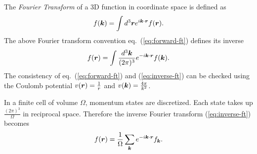 \begin{definition}
\label{sec:def-ft}
The \textit{Fourier Transform} of a 3D function in coordinate space is defined as
\begin{align}
f(\boldsymbol{k}) = \int d^3\boldsymbol{r} e^{i\boldsymbol{k}\cdot\boldsymbol{r}} f(\boldsymbol{r}). \label{eq:forward-ft}
\end{align}
The above Fourier transform convention eq.~(\ref{eq:forward-ft}) defines its inverse
\begin{align}
f(\boldsymbol{r}) = \int \frac{d^3\boldsymbol{k}}{(2\pi)^3} e^{-i\boldsymbol{k}\cdot\boldsymbol{r}} f(\boldsymbol{k}). \label{eq:inverse-ft}
\end{align}
The consistency of eq.~(\ref{eq:forward-ft}) and (\ref{eq:inverse-ft}) can be checked using the Coulomb potential $v(\boldsymbol{r})=\frac{1}{r}$ and $v(\boldsymbol{k})=\frac{4\pi}{k^2}$. 

In a finite cell of volume $\Omega$, momentum states are discretized. Each state takes up $\frac{(2\pi)^3}{\Omega}$ in reciprocal space. Therefore the inverse Fourier transform (\ref{eq:inverse-ft}) becomes
\begin{align} \label{eq:lattice-ift}
f(\boldsymbol{r}) = \frac{1}{\Omega} \sum\limits_{\boldsymbol{k}} e^{-i\boldsymbol{k}\cdot\boldsymbol{r}} f_{\boldsymbol{k}}.
\end{align}
\end{definition}

